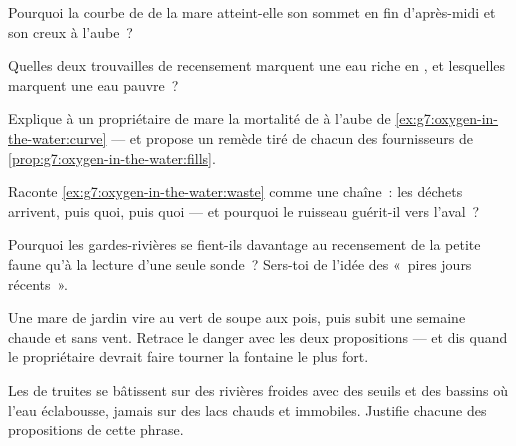 \begin{exercise}[$\star$]\label{exo:g7:oxygen-in-the-water:5}
Pourquoi la courbe de  de la mare atteint-elle son sommet
en fin d'après-midi et son creux à l'aube~?
\end{exercise}

\begin{exercise}[$\star$]\label{exo:g7:oxygen-in-the-water:6}
Quelles deux trouvailles de recensement marquent une eau riche en
, et lesquelles marquent une eau pauvre~?
\end{exercise}

\begin{exercise}[$\star\star$]\label{exo:g7:oxygen-in-the-water:7}
Explique à un propriétaire de mare la mortalité de  à l'aube
de \cref{ex:g7:oxygen-in-the-water:curve} --- et propose un remède
tiré de chacun des fournisseurs de
\cref{prop:g7:oxygen-in-the-water:fills}.
\end{exercise}

\begin{exercise}[$\star\star$]\label{exo:g7:oxygen-in-the-water:8}
Raconte \cref{ex:g7:oxygen-in-the-water:waste} comme une chaîne~:
les déchets arrivent, puis quoi, puis quoi --- et pourquoi le
ruisseau guérit-il vers l'aval~?
\end{exercise}

\begin{exercise}[$\star\star$]\label{exo:g7:oxygen-in-the-water:9}
Pourquoi les gardes-rivières se fient-ils davantage au recensement
de la petite faune qu'à la lecture d'une seule sonde~? Sers-toi de
l'idée des «~pires jours récents~».
\end{exercise}

\begin{exercise}[$\star\star$]\label{exo:g7:oxygen-in-the-water:10}
Une mare de jardin vire au vert de soupe aux pois, puis subit une
semaine chaude et sans vent. Retrace le danger avec les deux
propositions --- et dis quand le propriétaire devrait faire tourner
la fontaine le plus fort.
\end{exercise}

\begin{exercise}[$\star\star$]\label{exo:g7:oxygen-in-the-water:11}
Les  de truites se bâtissent sur des rivières froides avec
des seuils et des bassins où l'eau éclabousse, jamais sur des lacs
chauds et immobiles. Justifie chacune des propositions de cette
phrase.
\end{exercise}

